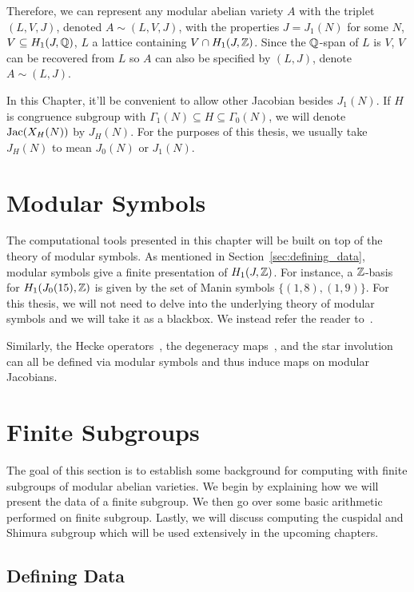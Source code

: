 Therefore, we can represent any modular abelian variety $A$ with the triplet
$(L, V, J)$, denoted $A\sim (L, V, J)$, with the properties $J=J_1(N)$
for some $N$, $V\subseteq H_1(J, \mathbb{Q})$, $L$ a lattice containing $V\cap H_1(J,
\mathbb{Z})$. Since the $\mathbb{Q}$-span of $L$ is $V$, $V$ can be recovered from $L$ so $A$
can also be specified by $(L, J)$, denote $A\sim (L, J)$.

In this Chapter, it'll be convenient to allow other Jacobian besides $J_1(N)$.
If $H$ is congruence subgroup with $\Gamma_1(N)\subseteq H\subseteq
\Gamma_0(N)$, we will denote $\operatorname{Jac}(X_H(N))$ by $J_H(N)$. For the purposes of
this thesis, we usually take $J_H(N)$ to mean $J_0(N)$ or $J_1(N)$.

\section{Modular Symbols}
\label{sec:modular_symbols}

The computational tools presented in this chapter will be built on top of the
theory of modular symbols. As mentioned in Section~\ref{sec:defining_data},
modular symbols give a finite presentation of $H_1(J, \mathbb{Z})$. For instance, a
$\mathbb{Z}$-basis for $H_1(J_0(15), \mathbb{Z})$ is given by the set of Manin symbols
$\{(1,8), (1,9)\}$. For this thesis, we will not need to delve into the
underlying theory of modular symbols and we will take it as a blackbox. We
instead refer the reader to~\cite[\S 3, \S 8, \S 9]{stein:modform}.

Similarly, the Hecke operators~\cite[\S 8.3]{stein:modform}, the degeneracy
maps~\cite[\S 8.6]{stein:modform}, and the star involution~\cite[\S
8.5]{stein:modform} can all be defined via modular symbols and thus induce maps
on modular Jacobians.

\section{Finite Subgroups}

The goal of this section is to establish some background for computing with
finite subgroups of modular abelian varieties. We begin by explaining how we
will present the data of a finite subgroup. We then go over some basic
arithmetic performed on finite subgroup. Lastly, we will discuss computing the
cuspidal and Shimura subgroup which will be used extensively in the upcoming
chapters.

\subsection{Defining Data}

